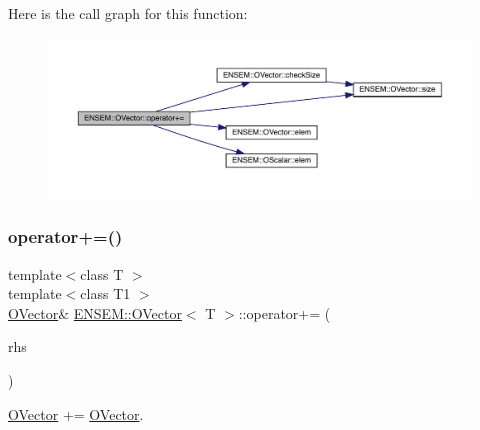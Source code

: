 Here is the call graph for this function\+:
\nopagebreak
\begin{figure}[H]
\begin{center}
\leavevmode
\includegraphics[width=350pt]{d0/d8d/classENSEM_1_1OVector_a6cb710cbb29083f2849c48da65292174_cgraph}
\end{center}
\end{figure}
\mbox{\label{classENSEM_1_1OVector_a5ecd1c4c6a2e7d9a6a3e5189b3a22ba5}} 
\subsubsection{\texorpdfstring{operator+=()}{operator+=()}\hspace{0.1cm}{\footnotesize\ttfamily [3/4]}}
{\footnotesize\ttfamily template$<$class T $>$ \\
template$<$class T1 $>$ \\
\mbox{\hyperlink{classENSEM_1_1OVector}{O\+Vector}}\& \mbox{\hyperlink{classENSEM_1_1OVector}{E\+N\+S\+E\+M\+::\+O\+Vector}}$<$ T $>$\+::operator+= (\begin{DoxyParamCaption}\item[{const \mbox{\hyperlink{classENSEM_1_1OVector}{O\+Vector}}$<$ T1 $>$ \&}]{rhs }\end{DoxyParamCaption})\hspace{0.3cm}{\ttfamily [inline]}}



\mbox{\hyperlink{classENSEM_1_1OVector}{O\+Vector}} += \mbox{\hyperlink{classENSEM_1_1OVector}{O\+Vector}}. 

